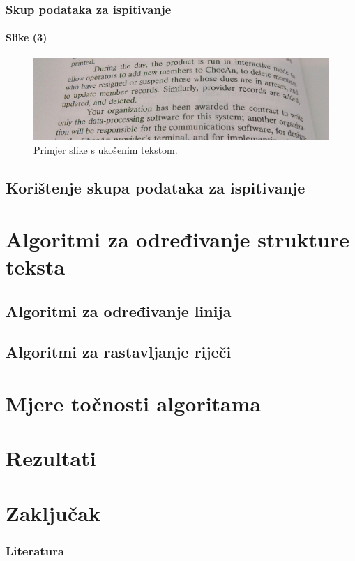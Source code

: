 \documentclass{beamer}
\begin{document}
\begin{frame}
\frametitle{Skup podataka za ispitivanje}
\framesubtitle{Slike (3)}
\begin{figure}[htb]
    \centering
    \includegraphics[width=\textwidth]{images/book-example-03.jpg}
    \caption{Primjer slike s ukošenim tekstom.}
    \label{fig:book-example-03}
\end{figure}
\end{frame}


\subsection{Korištenje skupa podataka za ispitivanje}

\section{Algoritmi za određivanje strukture teksta}
\subsection{Algoritmi za određivanje linija}

\subsection{Algoritmi za rastavljanje riječi}

\section{Mjere točnosti algoritama}
\section{Rezultati}
\section{Zaključak}

\begin{frame}
\frametitle{Literatura}


\end{frame}
\end{document}
